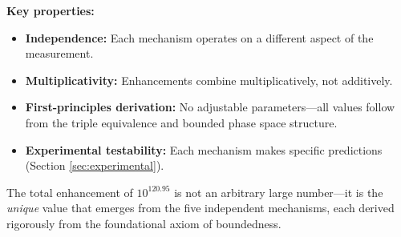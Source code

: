 \documentclass[twocolumn,10pt]{article}
\theoremstyle{remark}
\begin{document}
\textbf{Key properties:}
\begin{itemize}
    \item \textbf{Independence:} Each mechanism operates on a different aspect of the measurement.
    \item \textbf{Multiplicativity:} Enhancements combine multiplicatively, not additively.
    \item \textbf{First-principles derivation:} No adjustable parameters—all values follow from the triple equivalence and bounded phase space structure.
    \item \textbf{Experimental testability:} Each mechanism makes specific predictions (Section \ref{sec:experimental}).
\end{itemize}

The total enhancement of $10^{120.95}$ is not an arbitrary large number—it is the \textit{unique} value that emerges from the five independent mechanisms, each derived rigorously from the foundational axiom of boundedness.
\end{document}
